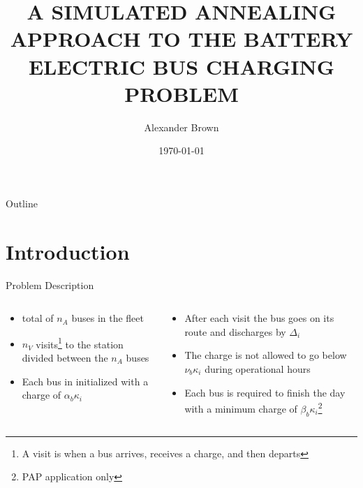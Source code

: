 \documentclass[bigger]{beamer}
\author{Alexander Brown}
\date{\today}
\title{A SIMULATED ANNEALING APPROACH TO THE BATTERY ELECTRIC BUS CHARGING PROBLEM}
\begin{document}
\maketitle
\begin{frame}{Outline}
\tableofcontents
\end{frame}


\section{Introduction}
\label{sec:orgb8562d0}
\begin{frame}[label={sec:orgca43c22}]{Problem Description}
\begin{columns}
\begin{column}{0.5\columnwidth}
\begin{itemize}
\item total of \(n_A\) buses in the fleet
\item \(n_V\) visits\footnote{A visit is when a bus arrives, receives a charge, and then departs} to the station divided between the \(n_A\) buses
\item Each bus in initialized with a charge of \(\alpha_b \kappa_i\)
\end{itemize}
\end{column}

\begin{column}{0.5\columnwidth}
\begin{itemize}
\item After each visit the bus goes on its route and discharges by \(\Delta_i\)
\item The charge is not allowed to go below \(\nu_b \kappa_i\) during operational hours
\item Each bus is required to finish the day with a minimum charge of \(\beta_b \kappa_i\)\footnote{PAP application only}
\end{itemize}
\end{column}
\end{columns}
\end{frame}
\end{document}
